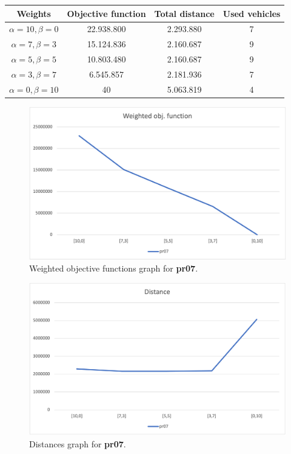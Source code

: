 {
\renewcommand{\arraystretch}{2}
\begin{longtable}[h]{| c | c | c | c |}
    \hline
    \textbf{Weights} & \textbf{Objective function} & \textbf{Total distance} & \textbf{Used vehicles} \\
    \hline
    \endhead
    $\alpha = 10, \beta = 0$ & 22.938.800 & 2.293.880 & 7 \\
    \hline
    $\alpha = 7, \beta = 3$  & 15.124.836 & 2.160.687 & 9 \\
    \hline
    $\alpha = 5, \beta = 5$  & 10.803.480 & 2.160.687 & 9 \\
    \hline
    $\alpha = 3, \beta = 7$  &  6.545.857 & 2.181.936 & 7 \\
    \hline
    $\alpha = 0, \beta = 10$ &         40 & 5.063.819 & 4 \\
    \hline
\end{longtable}
}
\begin{figure}[H]
    \centering
    \includegraphics[height=0.25\textheight]{../graphs/pr07-wobjf.png}
    \caption{Weighted objective functions graph for \textbf{pr07}.}
\end{figure}

\begin{figure}[H]
    \centering
    \includegraphics[height=0.25\textheight]{../graphs/pr07-distance.png}
    \caption{Distances graph for \textbf{pr07}.}
\end{figure}

